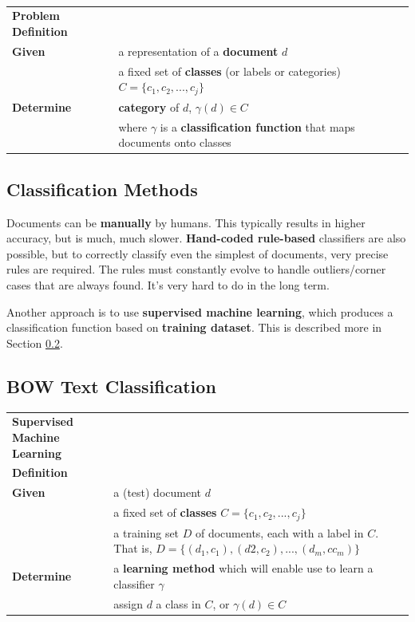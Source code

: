 \documentclass{article}
\begin{document}
\paragraph{}

\begin{tabular}{ll}
\textbf{Problem Definition} \\
\textbf{Given} & a representation of a \textbf{document} $d$ \\
& a fixed set of \textbf{classes} (or labels or categories) $C = \lbrace c_1, c_2, ..., c_j \rbrace$ \\
\textbf{Determine} & \textbf{category} of $d$, $\gamma(d) \in C$ \\
& where $\gamma$ is a \textbf{classification function} that maps documents onto classes \\
\end{tabular}

\subsection{Classification Methods}

Documents can be \textbf{manually} by humans. This typically results in higher accuracy, but is much, much slower. \textbf{Hand-coded rule-based} classifiers are also possible, but to correctly classify even the simplest of documents, very precise rules are required. The rules must constantly evolve to handle outliers/corner cases that are always found. It's very hard to do in the long term.

Another approach is to use \textbf{supervised machine learning}, which produces a classification function based on \textbf{training dataset}. This is described more in Section \ref{sec:bow-text-classification}.

\subsection{BOW Text Classification}
\label{sec:bow-text-classification}

\begin{tabular}{p{7cm}p{10cm}}
\textbf{Supervised Machine Learning} \\
\textbf{Definition} \\
\textbf{Given} & a (test) document $d$ \\
	& a fixed set of \textbf{classes} $C = \lbrace c_1, c_2, ..., c_j \rbrace$ \\
	& a training set $D$ of documents, each with a label in $C$. That is, $D = \lbrace (d_1, c_1), (d2, c_2), ..., (d_m,c c_m) \rbrace$ \\
\textbf{Determine} & a \textbf{learning method} which will enable use to learn a classifier $\gamma$ \\
	& assign $d$ a class in $C$, or $\gamma(d) \in C$
\end{tabular}
\end{document}

